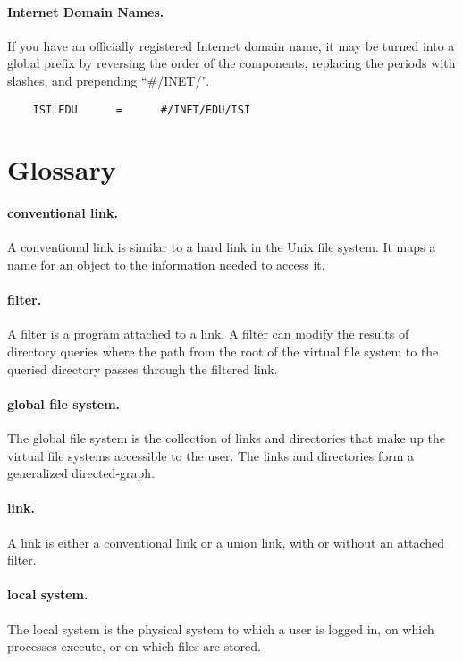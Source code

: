 \paragraph{Internet Domain Names.}   If you have an officially
registered Internet domain name, it may be turned into a global prefix
by reversing the order of the components, replacing the periods with
slashes, and prepending ``\#/INET/''.
\begin{verbatim}
    ISI.EDU      =      #/INET/EDU/ISI
\end{verbatim}

\section{Glossary}

\paragraph{conventional link.} A conventional link is similar to
a hard link in the Unix file system.  It maps a name for an object to
the information needed to access it.

\paragraph{filter.} A filter is a program attached to a link.
A filter can modify the results of directory queries where the path
from the root of the virtual file system to the queried directory
passes through the filtered link.

\paragraph{global file system.}  The global file system is the collection
of links and directories that make up the virtual file systems
accessible to the user.  The links and directories form a generalized
directed-graph. 

\paragraph{link.}  A link is either a conventional link or a union
link, with or without an attached filter.

\paragraph{local system.}  The local system is the physical system to
which a user is logged in, on which processes execute, or on which
files are stored. 

